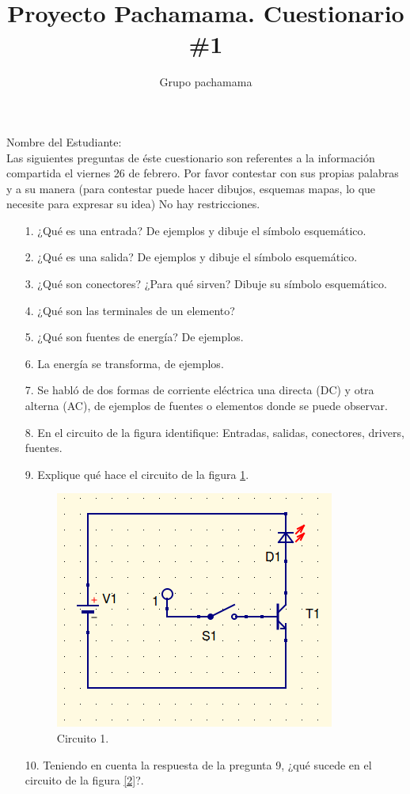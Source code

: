 \documentclass{article}
\title{Proyecto Pachamama. Cuestionario \#1}
\author{Grupo pachamama}
\begin{document}
\maketitle
Nombre del Estudiante:\\

Las siguientes preguntas de éste cuestionario son referentes a la información compartida el viernes 26 de febrero.
Por favor contestar con sus propias palabras y a su manera (para contestar puede hacer dibujos, esquemas mapas, lo que necesite para expresar su idea) No hay restricciones.

\begin{itemize}
		\item [1.] ¿Qué es una entrada? De ejemplos y dibuje el símbolo esquemático. 
		\item [2.] ¿Qué es una salida? De ejemplos y dibuje el símbolo esquemático.
		\item [3.] ¿Qué son conectores? ¿Para qué sirven? Dibuje su símbolo esquemático.
		\item [4.] ¿Qué son las terminales de un elemento?
		\item [5.] ¿Qué son fuentes de energía? De ejemplos.
		\item [6.] La energía se transforma, de ejemplos.
		\item [7.] Se habló de dos formas de corriente eléctrica una directa (DC) y otra alterna (AC), de ejemplos
				de fuentes o elementos donde se puede observar.
		\item [8.] En el circuito de la figura identifique: Entradas, salidas, conectores, drivers, fuentes.
		\item [9.] Explique qué hace el circuito de la figura \ref{1}.
\begin{figure}[hptp]
    \centering
    \includegraphics[scale=0.35]{circuito1.png}
    \caption{Circuito 1.}
    \label{1}
\end{figure}
\smallskip
		\item [10.] Teniendo en cuenta la respuesta de la pregunta 9, ¿qué sucede en el circuito de la figura \ref{2}?.


\end{itemize}
\end{document}
